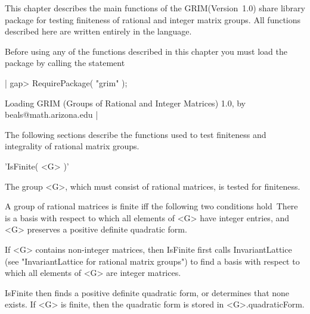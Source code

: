
\def\GRIM{{\sf GRIM}}

This chapter describes the main functions of the \GRIM (Version~1.0)
share library package for testing finiteness of rational and integer matrix
groups.  All functions described here are written entirely in the {\GAP}
language.

Before using any of the functions described in this chapter you must load
the package by calling the statement

|    gap> RequirePackage( "grim" );

    Loading  GRIM (Groups of Rational and Integer Matrices) 1.0,
    by beals@math.arizona.edu |


The  following sections describe  the functions  used to test finiteness
and integrality of rational matrix groups.



'IsFinite( <G> )'

The group <G>, which must consist of rational matrices,
is tested for finiteness.

A group of rational matrices is finite iff the following two conditions hold\:\
There is a basis with respect to which all elements of <G> have integer
entries, and <G> preserves a positive definite quadratic form.

If <G> contains non-integer matrices, then IsFinite first calls
InvariantLattice (see "InvariantLattice for rational matrix groups") to
find a basis with respect to which all elements of <G> are integer
matrices.

IsFinite then finds a positive definite quadratic form, or determines
that none exists.  If <G> is finite, then the quadratic form is stored
in <G>.quadraticForm.


